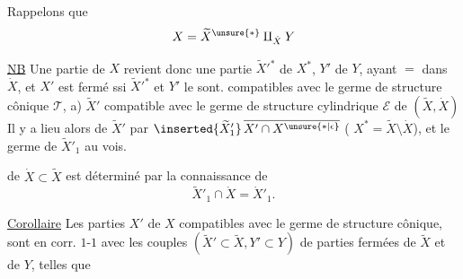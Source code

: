 
Rappelons que
\[
X=\widetilde X^{\unsure{*}}\amalg_{\dot X}Y
\]

\uline{NB} Une partie  de $X$ revient donc  une
partie $\widetilde X'^*$ de $X^*$, $Y'$ de $Y$, ayant $=$
 dans $\dot X$, et $X'$ est fermé ssi
$\widetilde X'^*$ et $Y'$ le sont. 
compatibles avec le germe de structure
cônique $\mathcal T$, 
a) $\widetilde X'$ compatible avec le germe de structure
cylindrique $\mathcal E$ de $(\widetilde X,\dot X)$
Il y a lieu alors de  $\widetilde X'$ par
$\inserted{\widetilde X'_1}\,\overline{X'\cap X^{\unsure{*|\epsilon}}}$
( $X^*=\widetilde X\setminus\dot X$), et le germe de $\widetilde X'_1$ au vois.

de $\dot X\subset\widetilde X$ est déterminé par la connaissance de
\[
\widetilde X'_1\cap\dot X=\dot X'_1.
\]

\uline{Corollaire} Les parties  $X'$ de $X$ compatibles avec
le germe de structure cônique, sont en
corr. $1$-$1$ avec les couples $(\widetilde X'\subset\widetilde X,Y'\subset Y)$
de parties fermées de $\widetilde X$ et de $Y$, telles que

